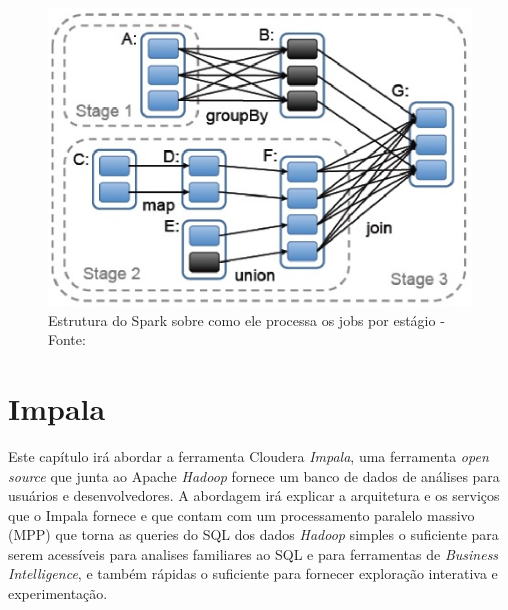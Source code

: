              \begin{figure}[ht!]
                        \centering
                        \includegraphics[keepaspectratio=true,scale=0.7]
                            {figuras/figura16.eps}
                        \caption[Estrutura do Spark sobre como ele processa os jobs por estágio]
                        {Estrutura do Spark sobre como ele processa os jobs por estágio -
                        \protect  Fonte: }
                        \label{figura16}
            \end{figure}

    \section{Impala}

        Este capítulo irá abordar a ferramenta Cloudera \textit{Impala}, uma ferramenta \textit{open source} que junta ao
        Apache \textit{Hadoop} fornece um banco de dados de análises para usuários e desenvolvedores. A abordagem irá
        explicar a arquitetura e os serviços que o Impala fornece e que contam com um processamento paralelo massivo (MPP)
        que torna as queries do SQL dos dados \textit{Hadoop} simples o suficiente para serem acessíveis para analises
        familiares ao SQL e para ferramentas de \textit{Business Intelligence}, e também rápidas o suficiente para fornecer
        exploração interativa e experimentação.

